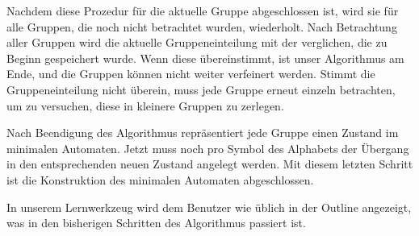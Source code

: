 Nachdem diese Prozedur für die aktuelle Gruppe abgeschlossen ist, wird sie für
alle Gruppen, die noch nicht betrachtet wurden, wiederholt. Nach Betrachtung aller
Gruppen wird die aktuelle Gruppeneinteilung mit der verglichen, die zu Beginn
gespeichert wurde. Wenn diese übereinstimmt, ist unser Algorithmus am Ende, und
die Gruppen können nicht weiter verfeinert werden. Stimmt die Gruppeneinteilung
nicht überein, muss jede Gruppe erneut einzeln betrachten, um zu versuchen,
diese in kleinere Gruppen zu zerlegen.\vspace{10pt}

Nach Beendigung des Algorithmus repräsentiert jede Gruppe einen Zustand
im minimalen Automaten. Jetzt muss noch pro Symbol des Alphabets der
Übergang in den entsprechenden neuen Zustand angelegt werden. Mit diesem
letzten Schritt ist die Konstruktion des minimalen Automaten
abgeschlossen.\vspace{10pt}

In unserem Lernwerkzeug wird dem Benutzer wie üblich in der Outline angezeigt,
was in den bisherigen Schritten des Algorithmus passiert ist.\vspace{10pt}

